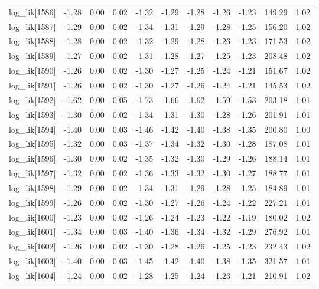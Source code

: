 \begin{table}[ht]
\begin{tabular}{rrrrrrrrrrr}
  log\_lik[1586] & -1.28 & 0.00 & 0.02 & -1.32 & -1.29 & -1.28 & -1.26 & -1.23 & 149.29 & 1.02 \\ 
  log\_lik[1587] & -1.29 & 0.00 & 0.02 & -1.34 & -1.31 & -1.29 & -1.28 & -1.25 & 156.20 & 1.02 \\ 
  log\_lik[1588] & -1.28 & 0.00 & 0.02 & -1.32 & -1.29 & -1.28 & -1.26 & -1.23 & 171.53 & 1.02 \\ 
  log\_lik[1589] & -1.27 & 0.00 & 0.02 & -1.31 & -1.28 & -1.27 & -1.25 & -1.23 & 208.48 & 1.02 \\ 
  log\_lik[1590] & -1.26 & 0.00 & 0.02 & -1.30 & -1.27 & -1.25 & -1.24 & -1.21 & 151.67 & 1.02 \\ 
  log\_lik[1591] & -1.26 & 0.00 & 0.02 & -1.30 & -1.27 & -1.26 & -1.24 & -1.21 & 145.53 & 1.02 \\ 
  log\_lik[1592] & -1.62 & 0.00 & 0.05 & -1.73 & -1.66 & -1.62 & -1.59 & -1.53 & 203.18 & 1.01 \\ 
  log\_lik[1593] & -1.30 & 0.00 & 0.02 & -1.34 & -1.31 & -1.30 & -1.28 & -1.26 & 201.91 & 1.01 \\ 
  log\_lik[1594] & -1.40 & 0.00 & 0.03 & -1.46 & -1.42 & -1.40 & -1.38 & -1.35 & 200.80 & 1.00 \\ 
  log\_lik[1595] & -1.32 & 0.00 & 0.03 & -1.37 & -1.34 & -1.32 & -1.30 & -1.28 & 187.08 & 1.01 \\ 
  log\_lik[1596] & -1.30 & 0.00 & 0.02 & -1.35 & -1.32 & -1.30 & -1.29 & -1.26 & 188.14 & 1.01 \\ 
  log\_lik[1597] & -1.32 & 0.00 & 0.02 & -1.36 & -1.33 & -1.32 & -1.30 & -1.27 & 188.77 & 1.01 \\ 
  log\_lik[1598] & -1.29 & 0.00 & 0.02 & -1.34 & -1.31 & -1.29 & -1.28 & -1.25 & 184.89 & 1.01 \\ 
  log\_lik[1599] & -1.26 & 0.00 & 0.02 & -1.30 & -1.27 & -1.26 & -1.24 & -1.22 & 227.21 & 1.01 \\ 
  log\_lik[1600] & -1.23 & 0.00 & 0.02 & -1.26 & -1.24 & -1.23 & -1.22 & -1.19 & 180.02 & 1.02 \\ 
  log\_lik[1601] & -1.34 & 0.00 & 0.03 & -1.40 & -1.36 & -1.34 & -1.32 & -1.29 & 276.92 & 1.01 \\ 
  log\_lik[1602] & -1.26 & 0.00 & 0.02 & -1.30 & -1.28 & -1.26 & -1.25 & -1.23 & 232.43 & 1.02 \\ 
  log\_lik[1603] & -1.40 & 0.00 & 0.03 & -1.45 & -1.42 & -1.40 & -1.38 & -1.35 & 321.57 & 1.01 \\ 
  log\_lik[1604] & -1.24 & 0.00 & 0.02 & -1.28 & -1.25 & -1.24 & -1.23 & -1.21 & 210.91 & 1.02 \\ 

\end{tabular}
\end{table}
